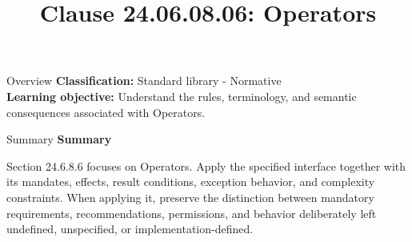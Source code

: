 \documentclass[10pt,letterpaper]{article}
\title{Clause 24.06.08.06: Operators}
\author{}
\date{}
\begin{document}
\maketitle
\begin{CornellOverviewBox}{Overview}
\textbf{Classification:} Standard library - Normative\\[2pt]
\textbf{Learning objective:} Understand the rules, terminology, and semantic consequences associated with Operators.
\end{CornellOverviewBox}\begin{CornellSummaryBox}{Summary}
{\sffamily\bfseries\color{Accent} Summary}\par\vspace{3pt}Section 24.6.8.6 focuses on Operators. Apply the specified interface together with its mandates, effects, result conditions, exception behavior, and complexity constraints. When applying it, preserve the distinction between mandatory requirements, recommendations, permissions, and behavior deliberately left undefined, unspecified, or implementation-defined.
\end{CornellSummaryBox}
\end{document}
